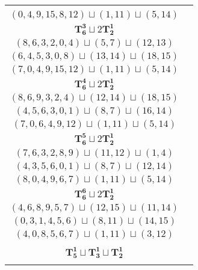 \documentclass{article}
\begin{document}
\begin{longtable}{|c|c|}
\begin{tabular}{c}
        $(11,12,10,7,5,13)\sqcup(1,4)\sqcup(17,15)$ \\ 
        $(0,4,9,15,8,12)\sqcup(1,11)\sqcup(5,14)$
        \end{tabular} \\ 
        \hline
        $\mathbf{T_{6}^{3}} \sqcup 2\mathbf{T_{2}^{1}}$ & \begin{tabular}{c}
        $(0,1,2,4,7,5)\sqcup(9,6)\sqcup(8,10)$ \\ 
        $(8,6,3,2,0,4)\sqcup(5,7)\sqcup(12,13)$ \\ 
        $(6,4,5,3,0,8)\sqcup(13,14)\sqcup(18,15)$ \\ 
        $(7,0,4,9,15,12)\sqcup(1,11)\sqcup(5,14)$
        \end{tabular} \\ 
        \hline
        $\mathbf{T_{6}^{4}} \sqcup 2\mathbf{T_{2}^{1}}$ & \begin{tabular}{c}
        $(1,2,5,4,6,7)\sqcup(13,14)\sqcup(12,15)$ \\ 
        $(8,6,9,3,2,4)\sqcup(12,14)\sqcup(18,15)$ \\ 
        $(4,5,6,3,0,1)\sqcup(8,7)\sqcup(16,14)$ \\ 
        $(7,0,6,4,9,12)\sqcup(1,11)\sqcup(5,14)$
        \end{tabular} \\ 
        \hline
        $\mathbf{T_{6}^{5}} \sqcup 2\mathbf{T_{2}^{1}}$ & \begin{tabular}{c}
        $(0,2,4,7,1,5)\sqcup(11,13)\sqcup(12,15)$ \\ 
        $(7,6,3,2,8,9)\sqcup(11,12)\sqcup(1,4)$ \\ 
        $(4,3,5,6,0,1)\sqcup(8,7)\sqcup(12,14)$ \\ 
        $(8,0,4,9,6,7)\sqcup(1,11)\sqcup(5,14)$
        \end{tabular} \\ 
        \hline
        $\mathbf{T_{6}^{6}} \sqcup 2\mathbf{T_{2}^{1}}$ & \begin{tabular}{c}
        $(0,2,1,3,4,5)\sqcup(12,14)\sqcup(18,19)$ \\ 
        $(4,6,8,9,5,7)\sqcup(12,15)\sqcup(11,14)$ \\ 
        $(0,3,1,4,5,6)\sqcup(8,11)\sqcup(14,15)$ \\ 
        $(4,0,8,5,6,7)\sqcup(1,11)\sqcup(3,12)$
        \end{tabular} \\ 
        \hline
        $\mathbf{T_{5}^{1}} \sqcup \mathbf{T_{3}^{1}} \sqcup \mathbf{T_{2}^{1}}$ & \begin{tabular}{c}

\end{tabular}
\end{longtable}
\end{document}
